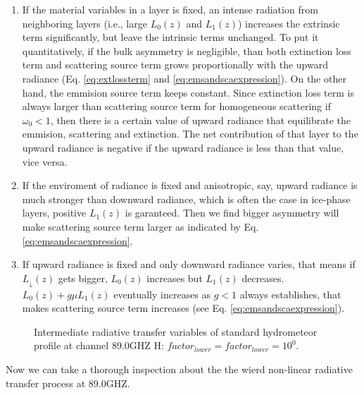 \begin{enumerate}
    \item {} If the material variables in a layer is fixed, an intense radiation from neighboring layers (i.e., large $L_{0}(z)$ and $L_{1}(z)$)
increases the extrinsic term significantly, but leave the intrinsic terms unchanged. To put it quantitatively, if the bulk asymmetry is negligible,
than both extinction loss term and scattering source term grows proportionally with the upward radiance (Eq. \ref{eq:extlossterm} and \ref{eq:emsandscaexpression}).
On the other hand, the emmision source term keeps constant. Since extinction loss term is always larger than scattering source term for homogeneous scattering if $\omega_{0} < 1$,
then there is a certain value of upward radiance that equilibrate the emmision, scattering and extinction. The net contribution of that layer to the upward radiance
is negative if the upward radiance is less than that value, vice versa.  
    \item {} If the enviroment of radiance is fixed and anisotropic, say, upward radiance is much stronger than downward radiance,
    which is often the case in ice-phase layers, positive $L_{1}(z)$ is garanteed. Then we find bigger asymmetry will make 
    scattering source term larger as indicated by Eq. \ref{eq:emsandscaexpression}.
    \item {} If upward radiance is fixed and only downward radiance varies, that means if $L_{\downarrow}(z)$ gets bigger, $L_{0}(z)$
    increases but $L_{1}(z)$ decreases. $L_{0}(z) + g\mu L_{1}(z)$ eventually increases as $g < 1$ always establishes, that makes scattering
    source term increases (see Eq. \ref{eq:emsandscaexpression}).  
\end{enumerate}

\begin{figure}[hbtp] 
\centering
{}
\caption{Intermediate radiative transfer variables of standard hydrometeor profile at channel 89.0GHZ H: $factor_{lower} = factor_{lower} = 10^{0}$.}
\label{fig:MWRI5zi33}
\end{figure}

Now we can take a thorough inspection about the the wierd non-linear radiative transfer process at 89.0GHZ.

